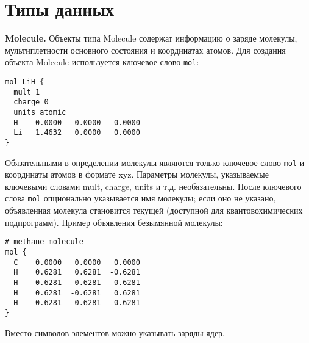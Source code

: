\documentclass[a4paper]{book}
\begin{document}
\section{Типы данных}
\textbf{Molecule.} Объекты типа Molecule содержат информацию о заряде молекулы, мультиплетности основного состояния и координатах атомов.
Для создания объекта Molecule используется ключевое слово \texttt{mol}:
\begin{lstlisting}
mol LiH {
  mult 1
  charge 0
  units atomic
  H    0.0000   0.0000   0.0000
  Li   1.4632   0.0000   0.0000
}
\end{lstlisting}
Обязательными в определении молекулы являются только ключевое слово \texttt{mol} и координаты атомов в формате xyz.
Параметры молекулы, указываемые ключевыми словами mult, charge, units и т.д. необязательны.
После ключевого слова \texttt{mol} опционально указывается имя молекулы; если оно не указано, объявленная
молекула становится текущей (доступной для квантовохимических подпрограмм). Пример объявления безымянной молекулы:
\begin{lstlisting}
# methane molecule
mol {
  C    0.0000   0.0000   0.0000
  H    0.6281   0.6281  -0.6281
  H   -0.6281  -0.6281  -0.6281
  H    0.6281  -0.6281   0.6281
  H   -0.6281   0.6281   0.6281
}
\end{lstlisting}

Вместо символов элементов можно указывать заряды ядер.
\end{document}
